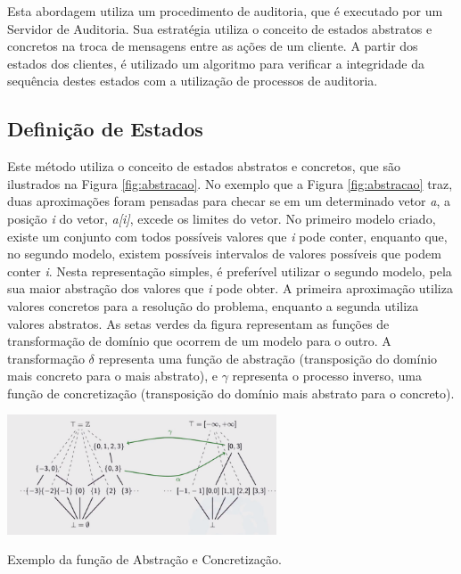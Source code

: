 Esta abordagem utiliza um procedimento de auditoria, que é executado por um Servidor de Auditoria. Sua estratégia utiliza o conceito de estados abstratos e concretos na troca de mensagens entre as ações de um cliente. A partir dos estados dos clientes, é utilizado um algoritmo para verificar a integridade da sequência destes estados com a utilização de processos de auditoria.

\subsection {Definição de Estados}
\label{cap:definicaoestado}

Este método utiliza o conceito de estados abstratos e concretos, que são ilustrados na Figura \ref{fig:abstracao}. No exemplo que a Figura \ref{fig:abstracao} traz, duas aproximações foram pensadas para checar se em um determinado vetor \textit{a}, a posição \textit{i} do vetor, \textit{a[i]}, excede os limites do vetor. No primeiro modelo criado, existe um conjunto com todos possíveis valores que \textit{i} pode conter, enquanto que, no segundo modelo, existem possíveis intervalos de valores possíveis que podem conter \textit{i}. Nesta representação simples, é preferível utilizar o segundo modelo, pela sua maior abstração dos valores que \textit{i} pode obter. A primeira aproximação utiliza valores concretos para a resolução do problema, enquanto a segunda utiliza valores abstratos. As setas verdes da figura representam as funções de transformação de domínio que ocorrem de um modelo para o outro.  A transformação $\delta$ representa uma função de abstração (transposição do domínio mais concreto para o mais abstrato), e $\gamma$ representa o processo inverso, uma função de concretização (transposição do domínio mais abstrato para o concreto).

\begin{ilustracao}[h!]
	\begin{center}
		\includegraphics[width=0.6\textwidth]{imagens/abstracao.png}
		\caption[Exemplo da função de Abstração e Concretização]{Exemplo da função de Abstração e Concretização.}
		\label{fig:abstracao}
	\end{center}
\end{ilustracao}

